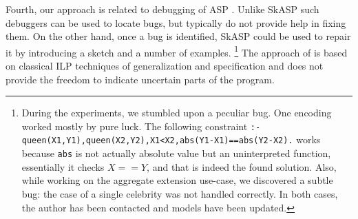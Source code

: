 Fourth, our approach is related to debugging of ASP \parencite{debugging_using_meta_asp,debugging_asp}. 
Unlike SkASP such debuggers can be used to locate bugs, but typically 
do not provide help in fixing them. On the other hand,
once a bug is identified, SkASP could be used to repair it by introducing a sketch and a number of examples. \footnote{ {\scriptsize During the experiments, we stumbled upon a peculiar bug. One encoding worked mostly by pure luck. The following constraint \texttt{:-queen(X1,Y1),queen(X2,Y2),X1<X2,abs(Y1-X1)==abs(Y2-X2).} works because \texttt{abs} is not actually absolute value but an 
uninterpreted function, essentially it checks $X == Y$, and that is indeed the found solution.  
Also, while working on the aggregate extension use-case, we discovered a subtle bug: the case of a single celebrity was not handled correctly. In both cases, the author has been contacted and models have been updated.}} The approach of \parencite{ilp_debugging_asp} is based on classical ILP techniques of generalization and specification and does not provide the freedom to indicate uncertain parts of the program.






